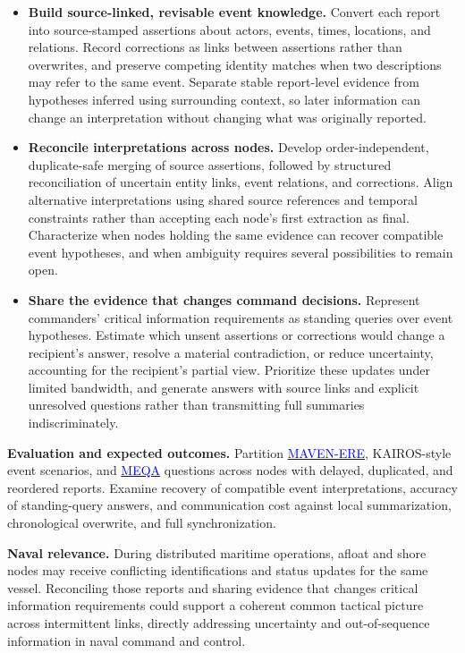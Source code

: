 \documentclass[11pt,letterpaper]{article}
\newcommand{\head}[1]{\textbf{#1}\enspace}
\begin{document}
\begin{itemize}
\item \textbf{Build source-linked, revisable event knowledge.} Convert each report into source-stamped assertions about actors, events, times, locations, and relations. Record corrections as links between assertions rather than overwrites, and preserve competing identity matches when two descriptions may refer to the same event. Separate stable report-level evidence from hypotheses inferred using surrounding context, so later information can change an interpretation without changing what was originally reported.
\item \textbf{Reconcile interpretations across nodes.} Develop order-independent, duplicate-safe merging of source assertions, followed by structured reconciliation of uncertain entity links, event relations, and corrections. Align alternative interpretations using shared source references and temporal constraints rather than accepting each node's first extraction as final. Characterize when nodes holding the same evidence can recover compatible event hypotheses, and when ambiguity requires several possibilities to remain open.
\item \textbf{Share the evidence that changes command decisions.} Represent commanders' critical information requirements as standing queries over event hypotheses. Estimate which unsent assertions or corrections would change a recipient's answer, resolve a material contradiction, or reduce uncertainty, accounting for the recipient's partial view. Prioritize these updates under limited bandwidth, and generate answers with source links and explicit unresolved questions rather than transmitting full summaries indiscriminately.
\end{itemize}
\head{Evaluation and expected outcomes.} Partition \href{https://aclanthology.org/2022.emnlp-main.60/}{\textcolor{blue}{MAVEN-ERE}}, KAIROS-style event scenarios, and \href{https://proceedings.neurips.cc/paper_files/paper/2024/hash/e560a0b22e4432003d0dba63ff8dc457-Abstract-Datasets_and_Benchmarks_Track.html}{\textcolor{blue}{MEQA}} questions across nodes with delayed, duplicated, and reordered reports. Examine recovery of compatible event interpretations, accuracy of standing-query answers, and communication cost against local summarization, chronological overwrite, and full synchronization.
\par\head{Naval relevance.} During distributed maritime operations, afloat and shore nodes may receive conflicting identifications and status updates for the same vessel. Reconciling those reports and sharing evidence that changes critical information requirements could support a coherent common tactical picture across intermittent links, directly addressing uncertainty and out-of-sequence information in naval command and control.
\end{document}
